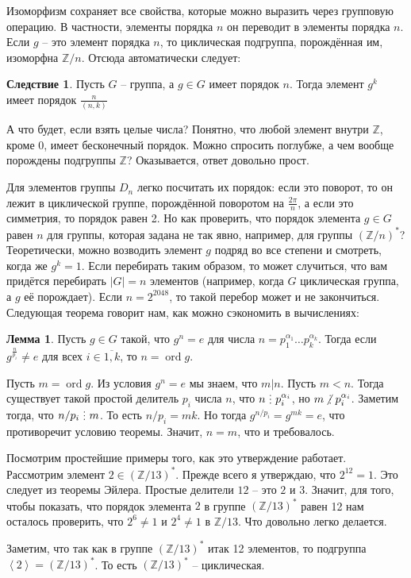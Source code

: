 \documentclass[10pt,a4paper,oneside]{book}
\theoremstyle{definition}
\newtheorem{lem}{\color{green!50!black}Лемма}
\newtheorem{cor}{\color{green!45!black}Следствие}
\newcommand{\mb}[1]{\mathbb{#1}}
\newcommand{\ovl}{\overline}
\newcommand{\ord}{\operatorname{ord}}
\newcommand{\di}{\mathop{\,\scalebox{0.85}{\raisebox{-1.2pt}[0.5\height]{\vdots}}\,}}
\newcommand{\ndi}{\mathop{\not\scalebox{0.85}{\raisebox{-1.2pt}[0.5\height]{\vdots}}\,}}
\def\lan{\left\langle }
\def\ran{\right\rangle}
\def\lm{\begin{lem}}
\def\elm{\end{lem}}
\def\crl{\begin{cor}}
\def\ecrl{\end{cor}}
\begin{document}
Изоморфизм сохраняет все свойства, которые можно выразить через групповую операцию. В частности, элементы порядка $n$ он переводит в элементы порядка $n$. Если $g$ -- это элемент порядка $n$, то циклическая подгруппа, порождённая им, изоморфна $\mb Z/n$. Отсюда автоматически следует: 

\crl Пусть $G$ -- группа, а $g\in G$ имеет порядок $n$. Тогда элемент $g^k$ имеет порядок $\frac{n}{(n,k)}$ 
\ecrl

А что будет, если взять целые числа? Понятно, что любой элемент внутри $\mb Z$, кроме $0$, имеет бесконечный порядок. Можно спросить поглубже, а чем вообще порождены подгруппы $\mb Z$? Оказывается, ответ довольно прост.

Для элементов группы $D_n$ легко посчитать их порядок: если это поворот, то он лежит в циклической группе, порождённой поворотом на $\frac{2\pi}{n}$, а если это симметрия, то порядок равен 2. Но как проверить, что порядок элемента  $g\in G$ равен $n$ для группы, которая задана не так явно, например, для группы $(\mb Z/n)^*$? Теоретически, можно возводить элемент $g$ подряд во все степени и смотреть, когда же $g^k=1$. Если перебирать таким образом, то может случиться, что вам придётся перебирать $|G|=n$ элементов (например, когда $G$ циклическая группа, а $g$ её порождает). Если $n=2^{2048}$, то такой перебор может и не закончиться. Следующая теорема говорит нам, как можно сэкономить в вычислениях:

\lm Пусть $g \in G$ такой, что $g^n=e$ для числа  $n=p_1^{\alpha_1}\dots p_k^{\alpha_k}$. Тогда если $g^{\frac{n}{p_i}}\neq e$ для всех $i\in\ovl{1,k}$, то $n=\ord g$. 
\elm
\proof Пусть $m=\ord g$. Из условия $g^n=e$ мы знаем, что $m | n$. Пусть $m<n$. Тогда существует такой простой делитель $p_i$ числа $n$, что $n\di p_i^{\alpha_i}$, но $m\ndi p_i^{\alpha_i}$. Заметим тогда, что $n/p_i \di m$. То есть $n/p_i=mk$. Но тогда $g^{n/p_i}=g^{mk}=e$, что противоречит условию теоремы. Значит, $n=m$, что и требовалось.
\endproof

Посмотрим простейшие примеры того, как это утверждение работает. Рассмотрим элемент $2\in (\mb Z/13)^*$. Прежде всего я утверждаю, что $2^{12}=1$. Это следует из теоремы Эйлера. Простые делители $12$ -- это $2$ и $3$. Значит, для того, чтобы показать, что порядок элемента $2$ в группе $(\mb Z/13)^*$ равен 12 нам осталось проверить, что $2^{6}\neq 1$ и $2^4\neq 1$ в $\mb Z/13$. Что довольно легко делается.

Заметим, что так как в группе $(\mb Z/13)^*$ итак 12 элементов, то подгруппа $\lan 2\ran =(\mb Z/13)^*$. То есть $(\mb Z/13)^*$ -- циклическая.
\end{document}
